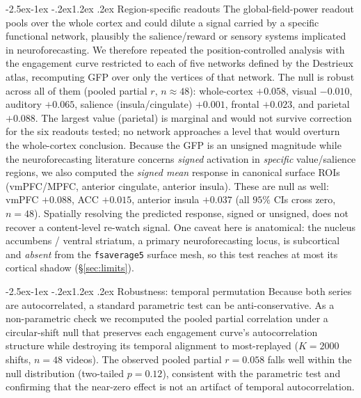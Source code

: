 \documentclass[11pt]{article}
\makeatletter
\renewcommand\subsection{\@startsection{subsection}{2}{\z@}%
  {-2.5ex\@plus -1ex \@minus -.2ex}{1.2ex \@plus .2ex}%
  {\normalfont\normalsize\sffamily\bfseries}}
\makeatother
\begin{document}
\subsection{Region-specific readouts}\label{sec:region}
The global-field-power readout pools over the whole cortex and could dilute a signal carried by a
specific functional network, plausibly the salience/reward or sensory systems implicated in
neuroforecasting. We therefore repeated the position-controlled analysis with the engagement curve
restricted to each of five networks defined by the Destrieux atlas, recomputing GFP over only the
vertices of that network. The null is robust across all of them (pooled partial $r$, $n{\approx}48$):
whole-cortex $+0.058$, visual $-0.010$, auditory $+0.065$, salience (insula/cingulate) $+0.001$,
frontal $+0.023$, and parietal $+0.088$. The largest value (parietal) is marginal and would not
survive correction for the six readouts tested; no network approaches a level that would overturn
the whole-cortex conclusion. Because the GFP is an unsigned magnitude while the neuroforecasting
literature concerns \emph{signed} activation in \emph{specific} value/salience regions, we also
computed the \emph{signed mean} response in canonical surface ROIs (vmPFC/MPFC, anterior cingulate,
anterior insula). These are null as well: vmPFC $+0.088$, ACC $+0.015$, anterior insula $+0.037$
(all $95\%$ CIs cross zero, $n{=}48$). Spatially resolving the predicted response, signed or
unsigned, does not recover a content-level re-watch signal. One caveat here is anatomical: the
nucleus accumbens / ventral striatum, a primary neuroforecasting locus, is
subcortical and \emph{absent} from the \texttt{fsaverage5} surface mesh, so this test reaches at
most its cortical shadow (\S\ref{sec:limits}).

\subsection{Robustness: temporal permutation}
Because both series are autocorrelated, a standard parametric test can be anti-conservative. As a
non-parametric check we recomputed the pooled partial correlation under a circular-shift null that
preserves each engagement curve's autocorrelation structure while destroying its temporal alignment
to most-replayed ($K{=}2000$ shifts, $n{=}48$ videos). The observed pooled partial $r=0.058$ falls
well within the null distribution (two-tailed $p=0.12$), consistent with the parametric test and
confirming that the near-zero effect is not an artifact of temporal autocorrelation.
\end{document}
